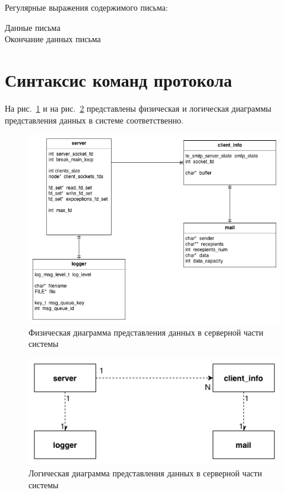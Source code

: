 \documentclass[a4paper,12pt]{report}
\begin{document}
Регулярные выражения содержимого письма:
\begin{description}
    \item[Данные письма]
    
    \item[Окончание данных письма]
    
\end{description}

\section{Синтаксис команд протокола}
На рис.~\ref{fig:uml_server_ph} и на рис.~\ref{fig:uml_server_log} представлены физическая и логическая
диаграммы представления данных в системе соответственно.

\begin{figure}
    \centering
    \includegraphics[width=\textwidth]{../images/uml_server_ph.png}
    \caption{Физическая диаграмма представления данных в серверной части системы}
    \label{fig:uml_server_ph}
\end{figure}

\begin{figure}
    \centering
    \includegraphics[width=\textwidth]{../images/uml_server_log.png}
    \caption{Логическая диаграмма представления данных в серверной части системы}
    \label{fig:uml_server_log}
\end{figure}
\end{document}

